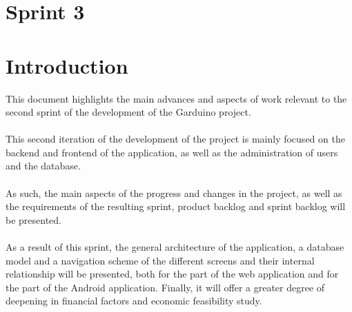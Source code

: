 \documentclass[11pt,a4paper]{article}
\begin{document}
\renewcommand{\headrulewidth}{0.5pt}
\renewcommand{\footrulewidth}{0.5pt}
\fancypagestyle{plain}{
\fancyhead[L]{}
\fancyhead[C]{}
\fancyhead[R]{\thepage}
\fancyfoot[L]{}
\fancyfoot[C]{}
\fancyfoot[R]{}
\renewcommand{\headrulewidth}{0pt}
\renewcommand{\footrulewidth}{0pt}
}
\pagestyle{fancy}
\vspace*{0.05in}

\tableofcontents

\newpage

\vspace*{0.3in}
\listoftables
\listoffigures
\newpage

\part*{Sprint 3}
\part*{Introduction}
This document highlights the main advances and aspects of work relevant to the second sprint of the development of the Garduino project. 
\\ \\
This second iteration of the development of the project is mainly focused on the backend and frontend of the application, as well as the administration of users and the database. 
\\ \\
As such, the main aspects of the progress and changes in the project, as well as the requirements of the resulting sprint, product backlog and sprint backlog will be presented. 
\\ \\
As a result of this sprint, the general architecture of the application, a database model and a navigation scheme of the different screens and their internal relationship will be presented, both for the part of the web application and for the part of the Android application. Finally, it will offer a greater degree of deepening in financial factors and economic feasibility study.
\end{document}
